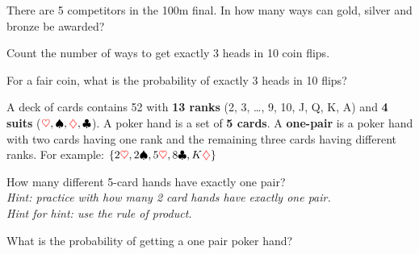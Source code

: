 \documentclass[10pt, a5paper]{scrartcl}
\begin{document}
\boardquestions

\begin{exercise}[Olympics]
  There are 5 competitors in the 100m final. In how many ways can gold,
  silver and bronze be awarded?
\end{exercise}


\begin{exercise}
  \begin{subex}
    Count the number of ways to get exactly 3 heads in 10 coin flips.
  \end{subex}
  
  \begin{subex}
    For a fair coin, what is the probability of exactly 3 heads in 10 flips?
  \end{subex}
\end{exercise}


\begin{exercise}[Poker]
  A deck of cards contains 52 with \textbf{13 ranks} (2, 3, \ldots, 9, 10, J,
  Q, K, A) and \textbf{4 suits} ($ {\color{red} \heartsuit}, \spadesuit ,
  {\color{red} \diamondsuit}, \clubsuit $). A poker hand is a set of \textbf{5
  cards}. A \textbf{one-pair} is a poker hand with two cards having one rank
  and the remaining three cards having different ranks. For example: 
  $ \{2{\color{red} \heartsuit}, 2\spadesuit, 5{\color{red} \heartsuit},
  8\clubsuit, K{\color{red} \diamondsuit} \}  $
  
  \begin{subex}
    How many different 5-card hands have exactly one pair? \\
    \emph{Hint: practice with how many 2 card hands have exactly one pair.}\\
    \emph{Hint for hint: use the rule of product.}
  \end{subex}
  
  \begin{subex}	
    What is the probability of getting a one pair poker hand?
  \end{subex}
\end{exercise}

\vfill\creditsboardquestions
\end{document}
